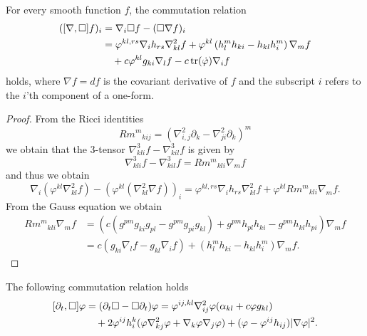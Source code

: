 \documentclass{amsart}
\begin{document}
\begin{lemma}
\label{lem:gradBox}
For every smooth function $f$, the commutation relation
\[
\begin{split}
([\nabla, \Box]f)_i &= \nabla_i \Box f - (\Box \nabla f)_i\\ 
                &= \varphi^{kl,rs} \nabla_i h_{rs} \nabla^2_{kl} f + \varphi^{kl}\left(h^{m}_{l}h_{ki} - h_{kl}h^{m}_{i}\right) \nabla_m f \\
&\quad + c \varphi^{kl} g_{ki} \nabla_l f - c \operatorname{tr}(\dot{\varphi}) \nabla_i f 
\end{split}
\]
holds, where \(\nabla f = df\) is the covariant derivative of \(f\) and the subscript \(i\) refers to the \(i\)'th component of a one-form.
\end{lemma}
\begin{proof}
From the Ricci identities
\[
{Rm^m}_{kij}  = \left(\nabla^2_{i, j} \partial_k - \nabla^2_{ji} \partial_k\right)^m
\]
we obtain that the $3$-tensor $\nabla^3_{kli}f-\nabla^3_{kil}f$
is given by
\[
\nabla^3_{kli}f-\nabla^3_{kil}f={Rm^m}_{kli}\nabla_m f
\]
and thus we obtain
\[
\nabla_i (\varphi^{kl} \nabla^2_{kl} f) - (\varphi^{kl}(\nabla^2_{kl} \nabla f))_i = \varphi^{kl,rs} \nabla_i h_{rs} \nabla^2_{kl}f + \varphi^{kl}{Rm^{m}}_{kli} \nabla_m f.
\]
From the Gauss equation we obtain
\[
\begin{split}
{Rm^{m}}_{kli} \nabla_m f &= \left(c\left(g^{pm}g_{ki}g_{pl}  - g^{pm}g_{pi}g_{kl}\right) + g^{pm} h_{pl}h_{ki} - g^{pm}h_{kl}h_{pi}\right) \nabla_m f \\
&= c\left(g_{ki} \nabla_l f - g_{kl} \nabla_i f\right) + \left(h^{m}_{l}h_{ki} - h_{kl}h^{m}_{i}\right) \nabla_m f.
\end{split}
\]
\end{proof}
\begin{lemma}
\label{lem:deltBox}
The following commutation relation holds
\[
\begin{split}
[\partial_t, \Box] \varphi &= (\partial_{t}\Box - \Box\partial_{t}) \varphi = \varphi^{ij,kl} \nabla^2_{ij} \varphi (\alpha_{kl} + c \varphi g_{kl}) \\
&\quad + 2\varphi^{ij}h^{k}_{i} (\varphi \nabla^2_{k
j} \varphi + \nabla_k \varphi \nabla_j \varphi) + (\varphi - \varphi^{ij}h_{ij})| \nabla\varphi|^{2}.
\end{split}
\]
\end{lemma}
\end{document}
